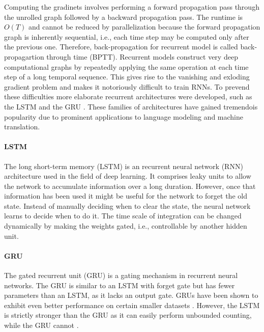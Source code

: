 \documentclass{scrartcl}
\begin{document}
Computing the gradinets involves performing a forward propagation pass through the unrolled graph followed by a backward propagation pass. The runtime is $O(T)$ and cannot be reduced by parallelization because the forward propagation graph is inherently sequential, i.e., each time step may be computed only after the previous one. Therefore, back-propagation for recurrent model is called back-propagartion through time (BPTT). Recurrent models construct very deep computational graphs by repeatedly applying the same operation at each time step of a long temporal sequence. This gives rise to the vanishing and exloding gradient problem and makes it notoriously difficult to train RNNs. To prevend these difficulties more elaborate recurrent architectures were developed, such as the LSTM \cite{Hochreiter1997} and the GRU \cite{Cho2014}. These families of architectures have gained tremendois popularity due to prominent applications to language modeling and machine translation. 

\paragraph{LSTM}
The long short-term memory (LSTM) \cite{Hochreiter1997} is an recurrent neural network (RNN) architecture used in the field of deep learning. It comprises leaky units to allow the network to accumulate information over a long duration. However, once that information has been used it might be useful for the network to forget the old state. Instead of manually deciding when to clear the state, the neural network learns to decide when to do it. The time scale of integration can be changed dynamically by making the weights gated, i.e., controllable by another hidden unit.

\paragraph{GRU}
The gated recurrent unit (GRU) \cite{Cho2014} is a gating mechanism in recurrent neural networks. The GRU is similar to an LSTM with forget gate but has fewer parameters than an LSTM, as it lacks an output gate. GRUs have been shown to exhibit even better performance on certain smaller datasets \cite{Chung2014}. However, the LSTM is strictly stronger than the GRU as it can easily perform unbounded counting, while the GRU cannot \cite{Weiss2018}.

\end{document}
